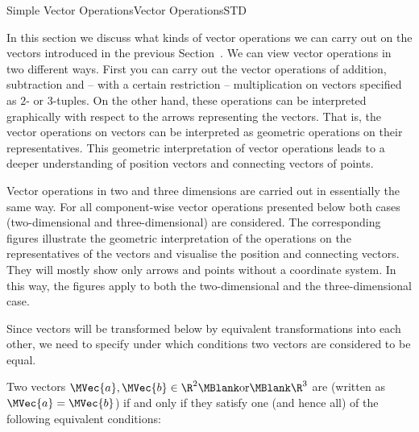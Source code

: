 \begin{MXContent}{Simple Vector Operations}{Vector Operations}{STD}

In this section we discuss what kinds of vector operations we can carry out on the vectors  
introduced in the previous Section~. We can view vector operations in two different ways. First you can carry out the vector operations of addition, subtraction and -- with a certain
restriction -- multiplication on vectors specified as $2$- or $3$-tuples. On the other hand, these operations can 
be interpreted graphically with respect to the arrows representing the vectors. That is, the vector operations on vectors
can be interpreted as geometric operations on their representatives. This geometric interpretation of 
vector operations leads to a deeper understanding of position vectors and connecting vectors of points.

Vector operations in two and three dimensions are carried out in essentially the same way. For all component-wise 
vector operations presented below both cases (two-dimensional and three-dimensional) are considered. The 
corresponding figures illustrate the geometric interpretation of the operations on the representatives 
of the vectors and visualise the position and connecting vectors. They will mostly show only arrows and points without 
a coordinate system. In this way, the figures apply to both the two-dimensional and the three-dimensional case.

Since vectors will be transformed below by equivalent transformations into each other, we need to specify under which conditions two vectors are considered to be equal.

\begin{MInfo}
Two vectors $\MVec{a},\MVec{b}\in\R^2\MBlank \textrm{or}\MBlank \R^3$ are  
(written as $\MVec{a}=\MVec{b}$) if and only if they satisfy one (and hence all) of the following equivalent conditions:


\end{MInfo}
\end{MXContent}
